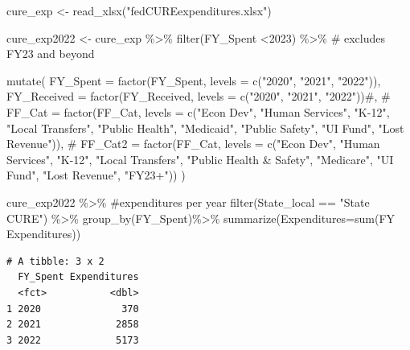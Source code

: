 \documentclass[
  letterpaper,
  DIV=11,
  numbers=noendperiod]{scrreport}
\newenvironment{Shaded}{\begin{snugshade}}{\end{snugshade}}
\newcommand{\AttributeTok}[1]{\textcolor[rgb]{0.40,0.45,0.13}{#1}}
\newcommand{\CommentTok}[1]{\textcolor[rgb]{0.37,0.37,0.37}{#1}}
\newcommand{\DecValTok}[1]{\textcolor[rgb]{0.68,0.00,0.00}{#1}}
\newcommand{\FunctionTok}[1]{\textcolor[rgb]{0.28,0.35,0.67}{#1}}
\newcommand{\NormalTok}[1]{\textcolor[rgb]{0.00,0.23,0.31}{#1}}
\newcommand{\OtherTok}[1]{\textcolor[rgb]{0.00,0.23,0.31}{#1}}
\newcommand{\SpecialCharTok}[1]{\textcolor[rgb]{0.37,0.37,0.37}{#1}}
\newcommand{\StringTok}[1]{\textcolor[rgb]{0.13,0.47,0.30}{#1}}
\begin{document}
\begin{Shaded}
\begin{Highlighting}[]
\NormalTok{cure\_exp }\OtherTok{\textless{}{-}} \FunctionTok{read\_xlsx}\NormalTok{(}\StringTok{"fedCUREexpenditures.xlsx"}\NormalTok{)}

\NormalTok{cure\_exp2022 }\OtherTok{\textless{}{-}}\NormalTok{ cure\_exp }\SpecialCharTok{\%\textgreater{}\%}
  \FunctionTok{filter}\NormalTok{(FY\_Spent }\SpecialCharTok{\textless{}}\DecValTok{2023}\NormalTok{) }\SpecialCharTok{\%\textgreater{}\%} \CommentTok{\# excludes FY23 and beyond}
  
  \FunctionTok{mutate}\NormalTok{(}
         \AttributeTok{FY\_Spent =} \FunctionTok{factor}\NormalTok{(FY\_Spent, }\AttributeTok{levels =} \FunctionTok{c}\NormalTok{(}\StringTok{"2020"}\NormalTok{, }\StringTok{"2021"}\NormalTok{, }\StringTok{"2022"}\NormalTok{)),}
         \AttributeTok{FY\_Received =} \FunctionTok{factor}\NormalTok{(FY\_Received, }\AttributeTok{levels =} \FunctionTok{c}\NormalTok{(}\StringTok{"2020"}\NormalTok{, }\StringTok{"2021"}\NormalTok{, }\StringTok{"2022"}\NormalTok{))}\CommentTok{\#,}
      \CommentTok{\#   FF\_Cat = factor(FF\_Cat, levels = c("Econ Dev", "Human Services", "K{-}12", "Local Transfers", "Public Health", "Medicaid", "Public Safety",  "UI Fund", "Lost Revenue")),}
     \CommentTok{\#    FF\_Cat2 = factor(FF\_Cat, levels = c("Econ Dev", "Human Services", "K{-}12", "Local Transfers", "Public Health \& Safety", "Medicare",  "UI Fund", "Lost Revenue", "FY23+"))}
\NormalTok{     )}



\NormalTok{cure\_exp2022 }\SpecialCharTok{\%\textgreater{}\%} \CommentTok{\#expenditures per year}
  \FunctionTok{filter}\NormalTok{(State\_local }\SpecialCharTok{==} \StringTok{"State CURE"}\NormalTok{) }\SpecialCharTok{\%\textgreater{}\%}
  \FunctionTok{group\_by}\NormalTok{(}\StringTok{\textasciigrave{}}\AttributeTok{FY\_Spent}\StringTok{\textasciigrave{}}\NormalTok{)}\SpecialCharTok{\%\textgreater{}\%} 
  \FunctionTok{summarize}\NormalTok{(}\AttributeTok{Expenditures=}\FunctionTok{sum}\NormalTok{(}\StringTok{\textasciigrave{}}\AttributeTok{FY Expenditures}\StringTok{\textasciigrave{}}\NormalTok{))}
\end{Highlighting}
\end{Shaded}

\begin{verbatim}
# A tibble: 3 x 2
  FY_Spent Expenditures
  <fct>           <dbl>
1 2020              370
2 2021             2858
3 2022             5173
\end{verbatim}
\end{document}
